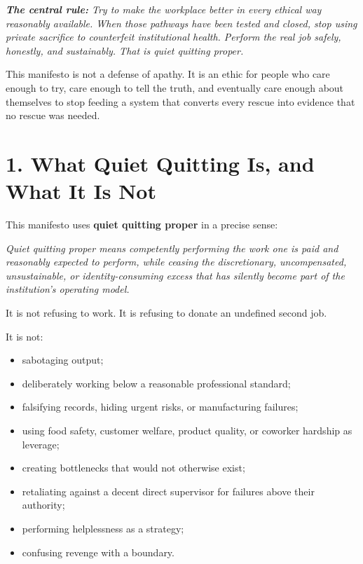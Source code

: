 \documentclass[11pt,oneside]{article}
\providecommand{\tightlist}{%
  \setlength{\itemsep}{0.22em}\setlength{\parskip}{0pt}}
\renewenvironment{quote}
  {\begin{tcolorbox}[
      enhanced,
      breakable,
      colback=ManifestLight,
      colframe=ManifestRule,
      boxrule=0pt,
      leftrule=3pt,
      arc=0pt,
      outer arc=0pt,
      left=10pt,right=10pt,top=8pt,bottom=8pt,
      before skip=0.8em,after skip=0.8em
    ]\itshape}
  {\end{tcolorbox}}
\begin{document}
\begin{quote}
\textbf{The central rule:} Try to make the workplace better in every ethical way reasonably available. When those pathways have been tested and closed, stop using private sacrifice to counterfeit institutional health. Perform the real job safely, honestly, and sustainably. That is quiet quitting proper.
\end{quote}

This manifesto is not a defense of apathy. It is an ethic for people who care enough to try, care enough to tell the truth, and eventually care enough about themselves to stop feeding a system that converts every rescue into evidence that no rescue was needed.

\section{1. What Quiet Quitting Is, and What It Is Not}\label{what-quiet-quitting-is-and-what-it-is-not}

This manifesto uses \textbf{quiet quitting proper} in a precise sense:

\begin{quote}
Quiet quitting proper means competently performing the work one is paid and reasonably expected to perform, while ceasing the discretionary, uncompensated, unsustainable, or identity-consuming excess that has silently become part of the institution's operating model.
\end{quote}

It is not refusing to work. It is refusing to donate an undefined second job.

It is not:

\begin{itemize}
\tightlist
\item
  sabotaging output;
\item
  deliberately working below a reasonable professional standard;
\item
  falsifying records, hiding urgent risks, or manufacturing failures;
\item
  using food safety, customer welfare, product quality, or coworker hardship as leverage;
\item
  creating bottlenecks that would not otherwise exist;
\item
  retaliating against a decent direct supervisor for failures above their authority;
\item
  performing helplessness as a strategy;
\item
  confusing revenge with a boundary.
\end{itemize}
\end{document}

